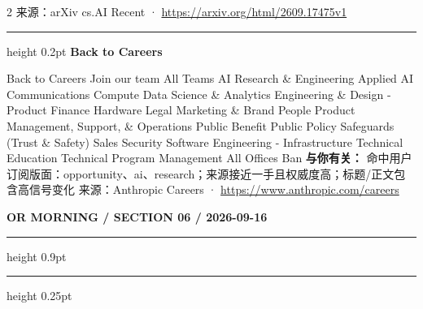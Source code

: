\documentclass[10.5pt]{ctexart}
\begin{document}
\begin{multicols}{2}
{\footnotesize\color{ormuted} 来源：arXiv cs.AI Recent · \url{https://arxiv.org/html/2609.17475v1}}
\vspace{2mm}
\hrule height 0.2pt
\vspace{2mm}
{\large\bfseries Back to Careers}\par
Back to Careers Join our team All Teams AI Research \& Engineering Applied AI Communications Compute Data Science \& Analytics Engineering \& Design - Product Finance Hardware Legal Marketing \& Brand People Product Management, Support, \& Operations Public Benefit Public Policy Safeguards (Trust \& Safety) Sales Security Software Engineering - Infrastructure Technical Education Technical Program Management All Offices Ban
\textbf{与你有关：} 命中用户订阅版面：opportunity、ai、research；来源接近一手且权威度高；标题/正文包含高信号变化
{\footnotesize\color{ormuted} 来源：Anthropic Careers · \url{https://www.anthropic.com/careers}}
\end{multicols}
\newpage
{\small\bfseries OR MORNING / SECTION 06 / 2026-09-16}
\vspace{2mm}
\hrule height 0.9pt
\vspace{1.5mm}
\hrule height 0.25pt
\vspace{4mm}
\end{document}
